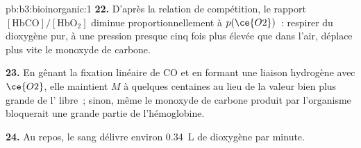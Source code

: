 \begin{solution}{pb:b3:bioinorganic:1}
\textbf{22.} D'après la relation de compétition, le rapport $[\mathrm{HbCO}]/[\mathrm{HbO_2}]$ diminue proportionnellement à $p(\ce{O2})$~:
respirer du dioxygène pur, à une pression presque cinq fois plus élevée que
dans l'air, déplace plus vite le monoxyde de carbone.

\textbf{23.} En gênant la fixation linéaire de CO et en formant une liaison hydrogène avec $\ce{O2}$, elle maintient $M$ à
quelques centaines au lieu de la valeur bien plus grande de l' libre~;
sinon, même le monoxyde de carbone produit par l'organisme bloquerait une
grande partie de l'hémoglobine.

\textbf{24.} Au repos, le sang délivre environ \qty{0.34}{L} de dioxygène par minute.
\end{solution}
